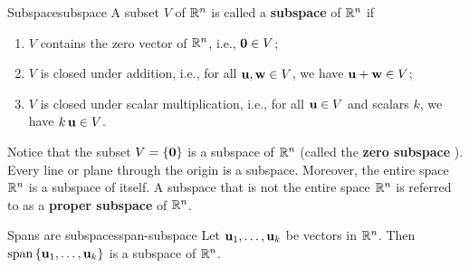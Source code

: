 \begin{definition}{Subspace}{subspace}
  A subset $V$ of\/ $\mathbb{R}^n$ is called a \textbf{subspace}%
   of\/ $\mathbb{R}^n$ if
  \begin{enumerate}
  \item $V$ contains the zero vector of\/ $\mathbb{R}^n$, i.e., $\vect{0}\in V$;
  \item $V$ is closed under addition, i.e., for all\/
    $\vect{u},\vect{w}\in V$, we have $\vect{u}+\vect{w}\in V$;
  \item $V$ is closed under scalar multiplication, i.e., for all\/
    $\vect{u}\in V$ and scalars $k$, we have\/ $k\,\vect{u}\in V$.
  \end{enumerate}
\end{definition}

Notice that the subset $V = \set{\vect{0}}$ is a subspace of\/ $\mathbb{R}^n$
(called the \textbf{zero subspace}%
%
). Every line or plane through the
origin is a subspace. Moreover, the entire space $\mathbb{R}^n$ is a subspace
of itself. A subspace that is not the entire space $\mathbb{R}^n$ is referred
to as a \textbf{proper subspace}%
%
 of\/ $\mathbb{R}^n$.

\begin{proposition}{Spans are subspaces}{span-subspace}
  Let $\vect{u}_1,\ldots,\vect{u}_k$ be vectors in $\mathbb{R}^n$. Then
  $\sspan\set{\vect{u}_1,\ldots,\vect{u}_k}$ is a subspace of
  $\mathbb{R}^n$.%
\end{proposition}

